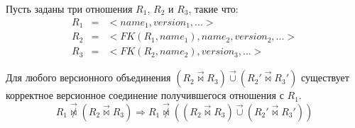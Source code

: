 \indent Пусть заданы три отношения $R_1$, $R_2$ и $R_3$, такие что:
\begin{eqnarray*}
	R_1 & = & <name_1, version_1, ...> \\
	R_2 & = & <FK(R_1, name_1), name_2, version_2, ...>\\
	R_3 & = & <FK(R_2, name_2), version_3, ...>
\end{eqnarray*}
\begin{theorem}
	\label{th:assoc}
	Для любого версионного объединения $(R_2 \overrightarrow{\bowtie} R_3 ) \overrightarrow{\cup} (R_2' \overrightarrow{\bowtie} R_3')$ существует корректное версионное соединение получившегося отношения с $R_1$.
	\begin{equation}
		R_1 \overrightarrow{\not\bowtie} (R_2 \overrightarrow{\bowtie} R_3) \Rightarrow R_1 \overrightarrow{\not\bowtie} ((R_2 \overrightarrow{\bowtie} R_3 ) \overrightarrow{\cup} (R_2' \overrightarrow{\bowtie} R_3'))
	\end{equation}
\end{theorem}
